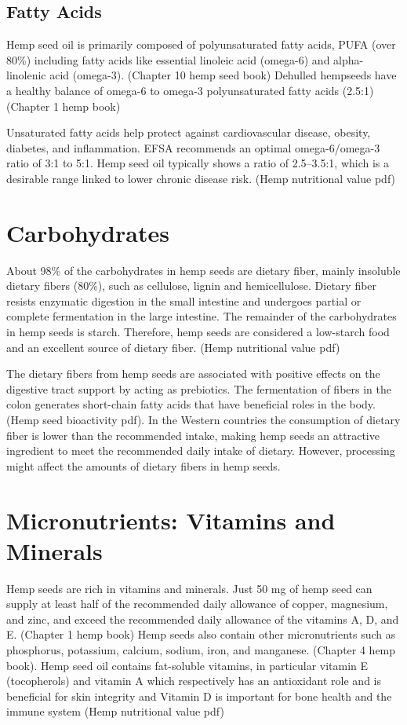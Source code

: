 \subsection{Fatty Acids}
Hemp seed oil is primarily composed of polyunsaturated fatty acids, PUFA (over 80\%) including fatty acids like essential linoleic acid (omega-6) and alpha-linolenic acid (omega-3). (Chapter 10 hemp seed book) Dehulled hempseeds have a healthy balance of omega-6 to omega-3 polyunsaturated fatty acids (2.5:1) (Chapter 1 hemp book)

\vspace{1em}
Unsaturated fatty acids help protect against cardiovascular disease, obesity, diabetes, and inflammation. EFSA recommends an optimal omega-6/omega-3 ratio of 3:1 to 5:1. Hemp seed oil typically shows a ratio of 2.5–3.5:1, which is a desirable range linked to lower chronic disease risk. (Hemp nutritional value pdf)

\section{Carbohydrates}
About 98\% of the carbohydrates in hemp seeds are dietary fiber, mainly insoluble dietary fibers (80\%), such as cellulose, lignin and hemicellulose. Dietary fiber resists enzymatic digestion in the small intestine and undergoes partial or complete fermentation in the large intestine. The remainder of the carbohydrates in hemp seeds is starch. Therefore, hemp seeds are considered a low-starch food and an excellent source of dietary fiber. (Hemp nutritional value pdf) 

\vspace{1em}
The dietary fibers from hemp seeds are associated with positive effects on the digestive tract support by acting as prebiotics. The fermentation of fibers in the colon generates short-chain fatty acids that have beneficial roles in the body. (Hemp seed bioactivity pdf). In the Western countries the consumption of dietary fiber is lower than the recommended intake, making hemp seeds an attractive ingredient to meet the recommended daily intake of dietary. However, processing might affect the amounts of dietary fibers in hemp seeds. 

\section{Micronutrients: Vitamins and Minerals}
Hemp seeds are rich in vitamins and minerals. Just 50 mg of hemp seed can supply at least half of the recommended daily allowance of copper, magnesium, and zinc, and exceed the recommended daily allowance of the vitamins A, D, and E. (Chapter 1 hemp book) Hemp seeds also contain other micronutrients such as phosphorus, potassium, calcium, sodium, iron, and manganese. (Chapter 4 hemp book). Hemp seed oil contains fat-soluble vitamins, in particular vitamin E (tocopherols) and vitamin A which respectively has an antioxidant role and is beneficial for skin integrity and Vitamin D is important for bone health and the immune system (Hemp nutritional value pdf)

